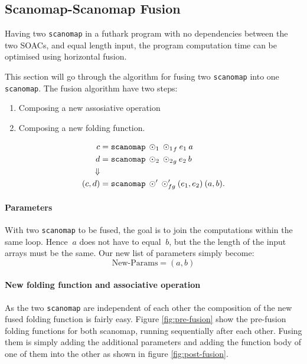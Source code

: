\documentclass[11pt]{article}
\begin{document}
\clearpage
\subsection{Scanomap-Scanomap Fusion}
Having two \texttt{scanomap} in a futhark program with no dependencies between the two SOACs, and equal length input, the program computation time can be optimised using horizontal fusion. 

This section will go through the algorithm for fusing two \texttt{scanomap} into one \texttt{scanomap}. The fusion algorithm have two steps:
\begin{enumerate}
\item Composing a new assosiative operation
\item Composing a new folding function.
\end{enumerate}

\begin{align*}
  c &= \mathtt{scanomap} \: \odot_1 \: {\odot_1}_f \: e_1 \: a \\
  d &= \mathtt{scanomap} \: \odot_2 \: {\odot_2}_g \: e_2 \: b \\
\Downarrow \\
  (c,d) &= \mathtt{scanomap} \: \odot' \: \odot'_{fg} \: (e_1, e_2) \: (a, b)\mathnormal{.}
\end{align*}


\paragraph{Parameters} With two \texttt{scanomap} to be fused, the goal is to join the computations within the same loop. Hence $\: a$ does not have to equal $\: b$, but the the length of the input arrays must be the same. Our new list of parameters simply become:
$$\text{New-Params} = (a,b)$$

\paragraph{New folding function and associative operation} As the two \texttt{scanomap} are independent of each other the composition of the new fused folding function is fairly easy. Figure \ref{fig:pre-fusion} show the pre-fusion folding functions for both scanomap, running sequentially after each other. Fusing them is simply adding the additional parameters and adding the function body of one of them into the other as shown in figure \ref{fig:post-fusion}. 
\end{document}
